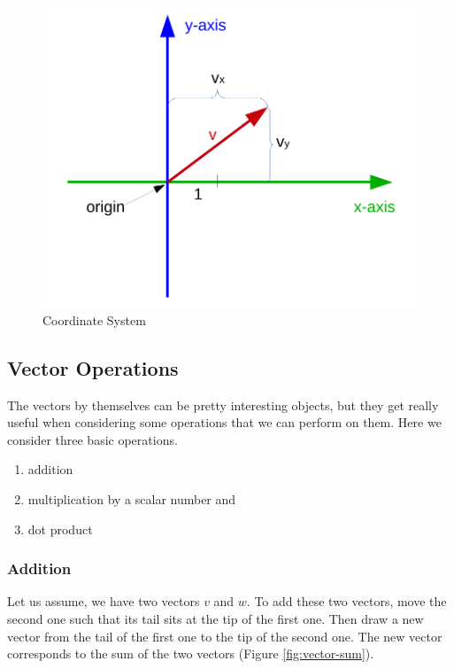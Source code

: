 \documentclass[
]{book}
\providecommand{\tightlist}{%
  \setlength{\itemsep}{0pt}\setlength{\parskip}{0pt}}
\begin{document}
\begin{figure}[!ht]
\includegraphics[width=1\linewidth,]{odg/coordinate-system} \caption{Coordinate System}\label{fig:coordinate-system}
\end{figure}

\hypertarget{intro-linalg-vector-operations}{%
\subsection{Vector Operations}\label{intro-linalg-vector-operations}}

The vectors by themselves can be pretty interesting objects, but they get really useful when considering some operations that we can perform on them. Here we consider three basic operations.

\begin{enumerate}
\def\labelenumi{\arabic{enumi}.}
\tightlist
\item
  addition
\item
  multiplication by a scalar number and
\item
  dot product
\end{enumerate}

\hypertarget{intro-linalg-vector-addition}{%
\subsubsection{Addition}\label{intro-linalg-vector-addition}}

Let us assume, we have two vectors \(v\) and \(w\). To add these two vectors, move the second one such that its tail sits at the tip of the first one. Then draw a new vector from the tail of the first one to the tip of the second one. The new vector corresponds to the sum of the two vectors (Figure \ref{fig:vector-sum}).
\end{document}
